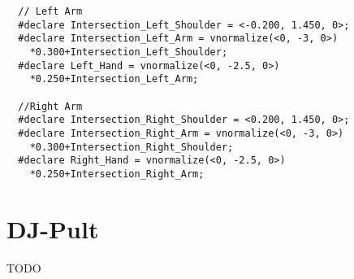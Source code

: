 \documentclass[paper=a4]{scrartcl}
\begin{document}
\begin{lstlisting}
  // Left Arm
  #declare Intersection_Left_Shoulder = <-0.200, 1.450, 0>;
  #declare Intersection_Left_Arm = vnormalize(<0, -3, 0>)
    *0.300+Intersection_Left_Shoulder;
  #declare Left_Hand = vnormalize(<0, -2.5, 0>)
    *0.250+Intersection_Left_Arm;

  //Right Arm
  #declare Intersection_Right_Shoulder = <0.200, 1.450, 0>;
  #declare Intersection_Right_Arm = vnormalize(<0, -3, 0>)
    *0.300+Intersection_Right_Shoulder;
  #declare Right_Hand = vnormalize(<0, -2.5, 0>)
    *0.250+Intersection_Right_Arm;
\end{lstlisting}


\section{DJ-Pult}
TODO
\end{document}
